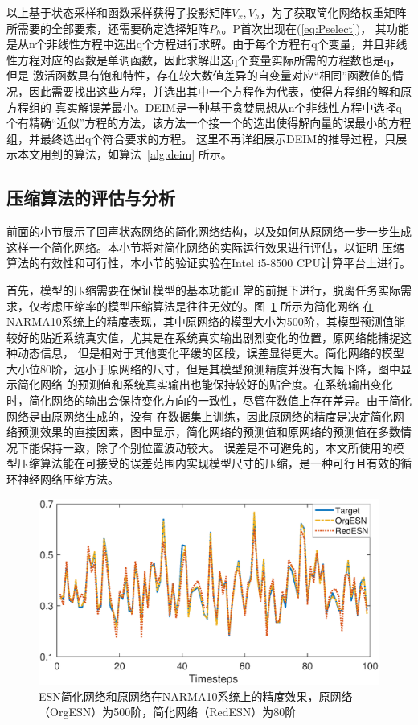 以上基于状态采样和函数采样获得了投影矩阵\(V_x,V_h\)，为了获取简化网络权重矩阵所需要的全部要素，还需要确定选择矩阵\(P_h\)。P首次出现在(\ref{eq:Pselect})，
其功能是从n个非线性方程中选出q个方程进行求解。由于每个方程有q个变量，并且非线性方程对应的函数是单调函数，因此求解出这q个变量实际所需的方程数也是q，但是
激活函数具有饱和特性，存在较大数值差异的自变量对应“相同”函数值的情况，因此需要找出这些方程，并选出其中一个方程作为代表，使得方程组的解和原方程组的
真实解误差最小。DEIM是一种基于贪婪思想从n个非线性方程中选择q个有精确“近似”方程的方法，该方法一个接一个的选出使得解向量的误最小的方程组，并最终选出q个符合要求的方程。
这里不再详细展示DEIM的推导过程，只展示本文用到的算法，如算法~\ref{alg:deim} 所示。
\subsection{压缩算法的评估与分析}
前面的小节展示了回声状态网络的简化网络结构，以及如何从原网络一步一步生成这样一个简化网络。本小节将对简化网络的实际运行效果进行评估，以证明
压缩算法的有效性和可行性，本小节的验证实验在Intel i5-8500 CPU计算平台上进行。

首先，模型的压缩需要在保证模型的基本功能正常的前提下进行，脱离任务实际需求，仅考虑压缩率的模型压缩算法是往往无效的。图~\ref{fig:accuracy} 所示为简化网络
在NARMA10系统上的精度表现，其中原网络的模型大小为500阶，其模型预测值能较好的贴近系统真实值，尤其是在系统真实输出剧烈变化的位置，原网络能捕捉这种动态信息，
但是相对于其他变化平缓的区段，误差显得更大。简化网络的模型大小位80阶，远小于原网络的尺寸，但是其模型预测精度并没有大幅下降，图中显示简化网络
的预测值和系统真实输出也能保持较好的贴合度。在系统输出变化时，简化网络的输出会保持变化方向的一致性，尽管在数值上存在差异。由于简化网络是由原网络生成的，没有
在数据集上训练，因此原网络的精度是决定简化网络预测效果的直接因素，图中显示，简化网络的预测值和原网络的预测值在多数情况下能保持一致，除了个别位置波动较大。
误差是不可避免的，本文所使用的模型压缩算法能在可接受的误差范围内实现模型尺寸的压缩，是一种可行且有效的循环神经网络压缩方法。
\begin{figure}
	\centering
	\includegraphics[width=1.0\columnwidth]{exp/500&80_all.eps}
	\caption{ESN简化网络和原网络在NARMA10系统上的精度效果，原网络（OrgESN）为500阶，简化网络（RedESN）为80阶}
	\label{fig:accuracy}
\end{figure}

